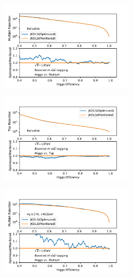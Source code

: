 \begin{figure}[htbp]
  \begin{subfigure}{.5\textwidth}
  \centering
   \includegraphics[width=0.75\textwidth]{figuresXbb/OPT/OPTQCD.pdf}
   \caption{}
  \end{subfigure}
  \begin{subfigure}{.5\textwidth}
  \centering
   \includegraphics[width=0.75\textwidth]{figuresXbb/OPT/OPTop.pdf}
    \caption{}
  \end{subfigure}
\newline 
   \begin{subfigure}{.5\textwidth}
  \centering
   \includegraphics[width=0.75\textwidth]{figuresXbb/OPT/OPTQCDMASS.pdf}

\end{subfigure}
\end{figure}

